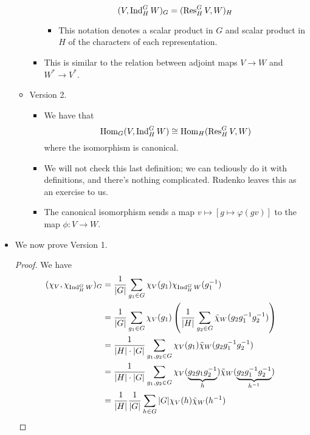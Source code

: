 \documentclass[../notes.tex]{subfiles}
\begin{document}
\begin{itemize}
\begin{itemize}
\begin{itemize}
            \begin{equation*}
                (V,\operatorname{Ind}_H^GW)_G = (\operatorname{Res}_H^GV,W)_H
            \end{equation*}
            \begin{itemize}
                \item This notation denotes a scalar product in $G$ and scalar product in $H$ of the characters of each representation.
            \end{itemize}
            \item This is similar to the relation between adjoint maps $V\to W$ and $W^*\to V^*$.
        \end{itemize}
        \item Version 2.
        \begin{itemize}
            \item We have that
            \begin{equation*}
                \operatorname{Hom}_G(V,\operatorname{Ind}_H^GW) \cong \operatorname{Hom}_H(\operatorname{Res}_H^GV,W)
            \end{equation*}
            where the isomorphism is canonical.
            \item We will not check this last definition; we can tediously do it with definitions, and there's nothing complicated. Rudenko leaves this as an exercise to us.
            \item The canonical isomorphism sends a map $v\mapsto[g\mapsto\varphi(gv)]$ to the map $\phi:V\to W$.
        \end{itemize}
    \end{itemize}
    \item We now prove Version 1.
    \begin{proof}
        We have
        \begin{align*}
            (\chi_V,\chi_{\ind_H^GW})_G &= \frac{1}{|G|}\sum_{g_1\in G}\chi_V(g_1)\chi_{\ind_H^GW}(g_1^{-1})\\
            &= \frac{1}{|G|}\sum_{g_1\in G}\chi_V(g_1)\left( \frac{1}{|H|}\sum_{g_2\in G}\tilde{\chi}_W(g_2g_1^{-1}g_2^{-1}) \right)\\
            &= \frac{1}{|H|\cdot|G|}\sum_{g_1,g_2\in G}\chi_V(g_1)\tilde{\chi}_W(g_2g_1^{-1}g_2^{-1})\\
            &= \frac{1}{|H|\cdot|G|}\sum_{g_1,g_2\in G}\chi_V(\underbrace{g_2g_1g_2^{-1}}_h)\tilde{\chi}_W(\underbrace{g_2g_1^{-1}g_2^{-1}}_{h^{-1}})\\
            &= \frac{1}{|H|}\frac{1}{|G|}\sum_{h\in G}|G|\chi_V(h)\tilde{\chi}_W(h^{-1})\\

\end{align*}
\end{proof}
\end{itemize}
\end{document}
